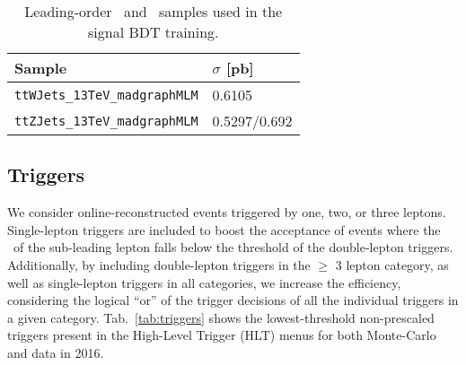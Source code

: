 \begin{table}
\centering
\begin{tabular}{ll}
                          Sample & $\sigma$ [pb] \\\hline
\verb|ttWJets_13TeV_madgraphMLM| & 0.6105 \\
\verb|ttZJets_13TeV_madgraphMLM| & 0.5297/0.692 \\\hline
\end{tabular}
\caption[Leading-order \ttW\ and \ttZ\ samples used in the signal BDT training.]{Leading-order \ttW\ and \ttZ\ samples used in the signal BDT training.} \label{tab:ttvlo_samples}
\end{table}

\subsection{Triggers}
We consider online-reconstructed events triggered by one, two, or three leptons. Single-lepton triggers are included to boost the acceptance of events where the \pt\ of the sub-leading lepton falls below the threshold of the double-lepton triggers. Additionally, by including double-lepton triggers in the $\geq$ 3 lepton category, as well as single-lepton triggers in all categories, we increase the efficiency, considering the logical ``or'' of the trigger decisions of all the individual triggers in a given category. Tab.~\ref{tab:triggers} shows the lowest-threshold non-prescaled triggers present in the High-Level Trigger (HLT) menus for both Monte-Carlo and data in 2016.

